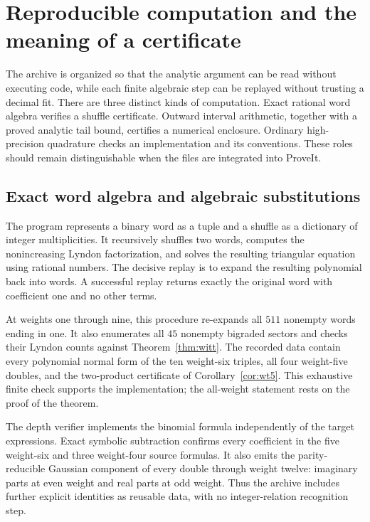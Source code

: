 \section{Reproducible computation and the meaning of a certificate}
\label{sec:computation}

The archive is organized so that the analytic argument can be read
without executing code, while each finite algebraic step can be replayed
without trusting a decimal fit. There are three distinct kinds of
computation. Exact rational word algebra verifies a shuffle certificate.
Outward interval arithmetic, together with a proved analytic tail bound,
certifies a numerical enclosure. Ordinary high-precision quadrature checks
an implementation and its conventions. These roles should remain
distinguishable when the files are integrated into ProveIt.

\subsection{Exact word algebra and algebraic substitutions}

The program  represents a binary word
as a tuple and a shuffle as a dictionary of integer multiplicities.
It recursively shuffles two words, computes the nonincreasing Lyndon
factorization, and solves the resulting triangular equation using
rational numbers. The decisive replay is to expand the resulting
polynomial back into words. A successful replay returns exactly the
original word with coefficient one and no other terms.

At weights one through nine, this procedure re-expands all \(511\)
nonempty words ending in one. It also enumerates all \(45\) nonempty
bigraded sectors and checks their Lyndon counts against
Theorem~\ref{thm:witt}. The recorded data contain every polynomial normal
form of the ten weight-six triples, all four weight-five doubles, and
the two-product certificate of Corollary~\ref{cor:wt5}.
This exhaustive finite check supports the implementation; the
all-weight statement rests on the proof of the theorem.

The depth verifier implements the binomial formula independently of the
target expressions. Exact symbolic subtraction confirms every coefficient
in the five weight-six and three weight-four source formulas.
It also emits the parity-reducible Gaussian component of every double
through weight twelve: imaginary parts at even weight and real parts at
odd weight. Thus the archive includes further explicit identities as
reusable data, with no integer-relation recognition step.

